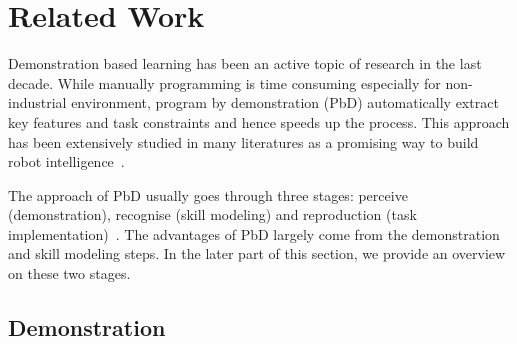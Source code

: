 \section{Related Work}
\label{sec:related}


Demonstration based learning has been an active topic of research in the last decade. While manually programming is time consuming especially for non-industrial environment, program by demonstration (PbD) automatically extract key features and task constraints and hence speeds up the process. This approach has been extensively studied in many literatures as a promising way to build robot intelligence~\cite{calinon2007learning,dillmann2004teaching,kulic2012incremental}.


The approach of PbD usually goes through three stages: perceive (demonstration), recognise (skill modeling) and reproduction (task implementation)~\cite{demiris2002f}. The advantages of PbD largely come from the demonstration and skill modeling steps. In the later part of this section, we provide an overview on these two stages.

\subsection{Demonstration}

